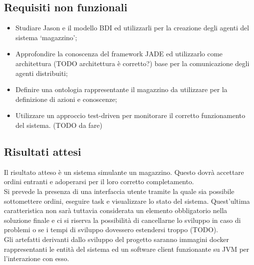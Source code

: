 \subsection{Requisiti non funzionali}
\begin{itemize}
    \item Studiare Jason e il modello BDI ed utilizzarli per la creazione degli agenti del sistema `magazzino';
    \item Approfondire la conoscenza del framework JADE ed utilizzarlo come architettura (TODO architettura è corretto?) base per la comunicazione degli agenti distribuiti;
    \item Definire una ontologia rappresentante il magazzino da utilizzare per la definizione di azioni e conoscenze;
    \item Utilizzare un approccio test-driven per monitorare il corretto funzionamento del sistema. (TODO da fare)
\end{itemize}

\subsection{Risultati attesi}
Il risultato atteso è un sistema simulante un magazzino. Questo dovrà accettare ordini entranti e adoperarsi per il loro corretto completamento.\\
Si prevede la presenza di una interfaccia utente tramite la quale sia possibile sottomettere ordini, eseguire task e visualizzare lo stato del sistema. Quest'ultima caratteristica non sarà tuttavia considerata un elemento obbligatorio nella soluzione finale e ci si riserva la possibilità di cancellarne lo sviluppo in caso di problemi o se i tempi di sviluppo dovessero estendersi troppo (TODO).\\
Gli artefatti derivanti dallo sviluppo del progetto saranno immagini docker rappresentanti le entità del sistema ed un software client funzionante su JVM per l'interazione con esso.


